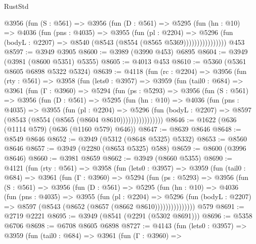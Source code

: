 \begin{lexlean}{RustStd}
\begin{coremodule}
                @3956
                  (fun (S : @561) =>
                  @3956
                    (fun (D : @561) =>
                    @5295
                      (fun (hn : @10) =>
                      @4036
                        (fun (pns : @4035) =>
                        @3955
                          (fun (pl : @2204) =>
                          @5296
                            (fun (bodyL : @2207) => @8540 (@8543 (@8554 (@8565 @5369))))))))))))))))
    @453
@8597 := @3949 @3905
@8600 := @3989 (@3990 @453) @6895
@8604 := @3949 (@3981 (@8600 @5351) @5355)
@8605 := @4013 @453
@8610 := @5360 (@5361 @8605 @6898 @5322 @5324)
@8639 := @4118
    (fun (rc : @2204) =>
    @3956
      (fun (rty : @561) =>
      @3958
        (fun (lets0 : @3957) =>
        @3959
          (fun (tail0 : @684) =>
          @3961
            (fun (Γ : @3960) =>
            @5294
              (fun (ps : @5293) =>
              @3956
                (fun (S : @561) =>
                @3956
                  (fun (D : @561) =>
                  @5295
                    (fun (hn : @10) =>
                    @4036
                      (fun (pns : @4035) =>
                      @3955
                        (fun (pl : @2204) =>
                        @5296
                          (fun (bodyL : @2207) =>
                          @8597 (@8543 (@8554 (@8565 (@8604 @8610))))))))))))))))
@8646 := @1622 (@636 (@1114 @579) (@636 (@1160 @579) @646))
@8647 := @8639 @8646
@8648 := @8549 @8646
@8652 := @3949 (@5312 (@8648 @5325) @5332)
@8653 := @8560 @8646
@8657 := @3949 (@2280 (@8653 @5325) @588)
@8659 := @8600 (@3996 @8646)
@8660 := @3981 @8659
@8662 := @3949 (@8660 @5355)
@8690 := @4121
    (fun (rty : @561) =>
    @3958
      (fun (lets0 : @3957) =>
      @3959
        (fun (tail0 : @684) =>
        @3961
          (fun (Γ : @3960) =>
          @5294
            (fun (ps : @5293) =>
            @3956
              (fun (S : @561) =>
              @3956
                (fun (D : @561) =>
                @5295
                  (fun (hn : @10) =>
                  @4036
                    (fun (pns : @4035) =>
                    @3955
                      (fun (pl : @2204) =>
                      @5296
                        (fun (bodyL : @2207) =>
                        @8597 (@8543 (@8652 (@8657 (@8662 @8610)))))))))))))))
    @579
@8691 := @2719 @2221
@8695 := @3949 (@8541 (@2291 (@5302 @8691)))
@8696 := @5358 @6706
@8698 := @6708 @8605 @6898
@8727 := @4143
    (fun (lets0 : @3957) =>
    @3959
      (fun (tail0 : @684) =>
      @3961
        (fun (Γ : @3960) =>

\end{coremodule}
\end{lexlean}
